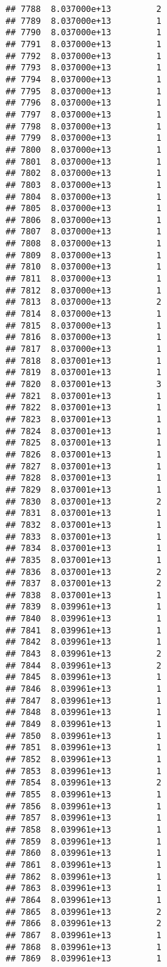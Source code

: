 \documentclass[
]{article}
\begin{document}
\begin{verbatim}
## 7788  8.037000e+13         2
## 7789  8.037000e+13         1
## 7790  8.037000e+13         1
## 7791  8.037000e+13         1
## 7792  8.037000e+13         1
## 7793  8.037000e+13         1
## 7794  8.037000e+13         1
## 7795  8.037000e+13         1
## 7796  8.037000e+13         1
## 7797  8.037000e+13         1
## 7798  8.037000e+13         1
## 7799  8.037000e+13         1
## 7800  8.037000e+13         1
## 7801  8.037000e+13         1
## 7802  8.037000e+13         1
## 7803  8.037000e+13         1
## 7804  8.037000e+13         1
## 7805  8.037000e+13         1
## 7806  8.037000e+13         1
## 7807  8.037000e+13         1
## 7808  8.037000e+13         1
## 7809  8.037000e+13         1
## 7810  8.037000e+13         1
## 7811  8.037000e+13         1
## 7812  8.037000e+13         1
## 7813  8.037000e+13         2
## 7814  8.037000e+13         1
## 7815  8.037000e+13         1
## 7816  8.037000e+13         1
## 7817  8.037000e+13         1
## 7818  8.037001e+13         1
## 7819  8.037001e+13         1
## 7820  8.037001e+13         3
## 7821  8.037001e+13         1
## 7822  8.037001e+13         1
## 7823  8.037001e+13         1
## 7824  8.037001e+13         1
## 7825  8.037001e+13         1
## 7826  8.037001e+13         1
## 7827  8.037001e+13         1
## 7828  8.037001e+13         1
## 7829  8.037001e+13         1
## 7830  8.037001e+13         2
## 7831  8.037001e+13         1
## 7832  8.037001e+13         1
## 7833  8.037001e+13         1
## 7834  8.037001e+13         1
## 7835  8.037001e+13         1
## 7836  8.037001e+13         2
## 7837  8.037001e+13         2
## 7838  8.037001e+13         1
## 7839  8.039961e+13         1
## 7840  8.039961e+13         1
## 7841  8.039961e+13         1
## 7842  8.039961e+13         1
## 7843  8.039961e+13         2
## 7844  8.039961e+13         2
## 7845  8.039961e+13         1
## 7846  8.039961e+13         1
## 7847  8.039961e+13         1
## 7848  8.039961e+13         1
## 7849  8.039961e+13         1
## 7850  8.039961e+13         1
## 7851  8.039961e+13         1
## 7852  8.039961e+13         1
## 7853  8.039961e+13         1
## 7854  8.039961e+13         2
## 7855  8.039961e+13         1
## 7856  8.039961e+13         1
## 7857  8.039961e+13         1
## 7858  8.039961e+13         1
## 7859  8.039961e+13         1
## 7860  8.039961e+13         1
## 7861  8.039961e+13         1
## 7862  8.039961e+13         1
## 7863  8.039961e+13         1
## 7864  8.039961e+13         1
## 7865  8.039961e+13         2
## 7866  8.039961e+13         2
## 7867  8.039961e+13         1
## 7868  8.039961e+13         1
## 7869  8.039961e+13         1

\end{verbatim}
\end{document}
